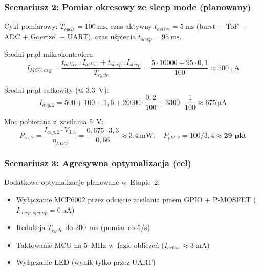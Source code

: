 \documentclass[a4paper,11pt]{article}
\begin{document}
\subsubsection{Scenariusz 2: Pomiar okresowy ze sleep mode (planowany)}

Cykl pomiarowy: $T_{cycle} = \SI{100}{\milli\second}$, czas aktywny
$t_{active} = \SI{5}{\milli\second}$ (burst + ToF + ADC + Goertzel + UART),
czas uśpienia $t_{sleep} = \SI{95}{\milli\second}$.

Średni prąd mikrokontrolera:
\begin{equation}
    I_{MCU,avg} = \frac{t_{active} \cdot I_{active} + t_{sleep} \cdot I_{sleep}}{T_{cycle}}
    = \frac{5 \cdot 10000 + 95 \cdot 0{,}1}{100} \approx \SI{500}{\micro\ampere}
    \label{eq:imcu_avg}
\end{equation}

Średni prąd całkowity (@ \SI{3,3}{\volt}):
\begin{equation}
    I_{avg,2} = 500 + 100 + 1{,}6 + 20000 \cdot \frac{0{,}2}{100} + 3300 \cdot \frac{1}{100}
    \approx \SI{675}{\micro\ampere}
\end{equation}

Moc pobierana z~zasilania \SI{5}{\volt}:
\begin{equation}
    P_{in,2} = \frac{I_{avg,2} \cdot V_{3,3}}{\eta_{LDO}} = \frac{0{,}675 \cdot 3{,}3}{0{,}66}
    \approx \SI{3,4}{\milli\watt}, \quad
    P_{pkt,2} = 100/3{,}4 \approx \textbf{29~pkt}
    \label{eq:moc_scen2}
\end{equation}

\subsubsection{Scenariusz 3: Agresywna optymalizacja (cel)}

Dodatkowe optymalizacje planowane w~Etapie~2:
\begin{itemize}[nosep]
    \item Wyłączanie MCP6002 przez odcięcie zasilania pinem GPIO + P-MOSFET
          ($I_{sleep,opamp} = \SI{0}{\micro\ampere}$)
    \item Redukcja $T_{cycle}$ do \SI{200}{\milli\second} (pomiar co 5/s)
    \item Taktowanie MCU na \SI{5}{\mega\hertz} w~fazie obliczeń
          ($I_{active} \approx \SI{3}{\milli\ampere}$)
    \item Wyłączanie LED (wynik tylko przez UART)
\end{itemize}
\end{document}

